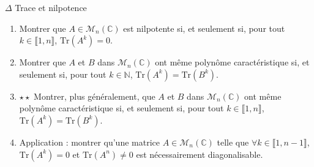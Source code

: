 \documentclass[french,a4paper]{article}
\newcommand{\N}{\mathbb{N}}
\newcommand{\C}{\mathbb{C}}
\newcommand{\Tr}{\text{Tr}}
\theoremstyle{plain}
\theoremstyle{definition}
\theoremstyle{remark}
\begin{document}
\begin{ex}{$\Delta$ Trace et nilpotence}
	\begin{enumerate}
		\item Montrer que $A\in\mathcal{M}_n(\C)$ est nilpotente si, et seulement si, pour tout $k\in\llbracket1,n\rrbracket$, $\Tr(A^k)=0$.
		\item Montrer que $A$ et $B$ dans $\mathcal{M}_n(\C)$ ont même polynôme caractéristique si, et seulement si, pour tout $k\in\N$, $\Tr(A^k)=\Tr(B^k)$.
		\item $\star\star$ Montrer, plus généralement, que $A$ et $B$ dans $\mathcal{M}_n(\C)$ ont même polynôme caractéristique si, et seulement si, pour tout $k\in\llbracket1,n\rrbracket$, $\Tr(A^k)=\Tr(B^k)$.
		\item Application : montrer qu'une matrice $A\in\mathcal{M}_n(\C)$ telle que $\forall k\in\llbracket1,n-1\rrbracket$, $\Tr(A^k)=0$ et $\Tr(A^n)\ne 0$ est nécessairement diagonalisable.
	\end{enumerate}
\end{ex}
\end{document}
